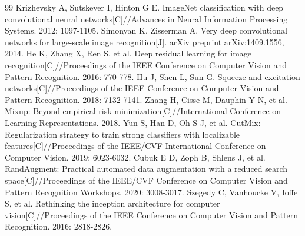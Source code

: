 \documentclass[12pt,a4paper]{ctexart}
\begin{document}
\begin{thebibliography}{99}
 Krizhevsky A, Sutskever I, Hinton G E. ImageNet classification with deep convolutional neural networks[C]//Advances in Neural Information Processing Systems. 2012: 1097-1105.
 Simonyan K, Zisserman A. Very deep convolutional networks for large-scale image recognition[J]. arXiv preprint arXiv:1409.1556, 2014.
 He K, Zhang X, Ren S, et al. Deep residual learning for image recognition[C]//Proceedings of the IEEE Conference on Computer Vision and Pattern Recognition. 2016: 770-778.
 Hu J, Shen L, Sun G. Squeeze-and-excitation networks[C]//Proceedings of the IEEE Conference on Computer Vision and Pattern Recognition. 2018: 7132-7141.
 Zhang H, Cisse M, Dauphin Y N, et al. Mixup: Beyond empirical risk minimization[C]//International Conference on Learning Representations. 2018.
 Yun S, Han D, Oh S J, et al. CutMix: Regularization strategy to train strong classifiers with localizable features[C]//Proceedings of the IEEE/CVF International Conference on Computer Vision. 2019: 6023-6032.
 Cubuk E D, Zoph B, Shlens J, et al. RandAugment: Practical automated data augmentation with a reduced search space[C]//Proceedings of the IEEE/CVF Conference on Computer Vision and Pattern Recognition Workshops. 2020: 3008-3017.
 Szegedy C, Vanhoucke V, Ioffe S, et al. Rethinking the inception architecture for computer vision[C]//Proceedings of the IEEE Conference on Computer Vision and Pattern Recognition. 2016: 2818-2826.
\end{thebibliography}
\end{document}
